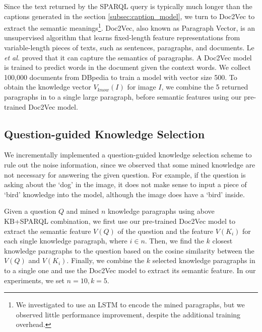 \documentclass[10pt,journal,compsoc]{IEEEtran}
\newcommand{\etal}{\emph{et al.}}
\def\Know{{V_{know}}}
\begin{document}
Since the text returned by the SPARQL query is typically much longer than the captions generated in the section \ref{subsec:caption_model}, we turn to Doc2Vec \cite{le2014distributed} to extract the semantic meanings\footnote{We investigated to use an LSTM to encode the mined paragraphs, but we observed little performance improvement, despite the additional training overhead.}. Doc2Vec, also known as Paragraph Vector, is an unsupervised algorithm that learns fixed-length feature representations from variable-length pieces of texts, such as sentences, paragraphs, and documents. Le \etal \cite{le2014distributed}  proved that it can capture the semantics of paragraphs. A Doc2Vec model is trained to predict words in the document given the context words. We collect 100,000 documents from  DBpedia to train a model with vector size 500. To obtain the knowledge vector $\Know(I)$ for image $I$, we combine the 5 returned paragraphs in to a single large paragraph, before semantic features using our pre-trained Doc2Vec model.

\vspace{-10pt}
\subsection{Question-guided Knowledge Selection}
\label{subsec:selected}
We incrementally implemented a question-guided knowledge selection scheme to rule out the noise information, since we observed that some mined knowledge are not necessary for answering the given question. For example, if the question is asking about the `dog' in the image, it does not make sense to input a piece of `bird' knowledge into the model, although the image does have a `bird' inside.

Given a question $Q$ and mined $n$ knowledge paragraphs using above KB+SPARQL combination, we first use our pre-trained Doc2Vec model to extract the semantic feature $V(Q)$ of the question and the feature $V(K_i)$ for each single knowledge paragraph, where $i \in n$. Then, we find the $k$ closest knowledge paragraphs to the question based on the cosine similarity between the $V(Q)$ and $V(K_i)$. Finally, we combine the $k$ selected knowledge paragraphs in to a single one and use the Doc2Vec model to extract its semantic feature. In our experiments, we set $n=10, k=5$.
\end{document}
